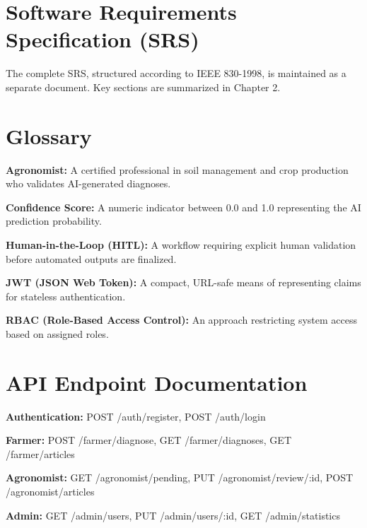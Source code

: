 \documentclass[12pt]{article}
\begin{document}
\newpage
\appendix
\section{Software Requirements Specification (SRS)}
The complete SRS, structured according to IEEE 830-1998, is maintained as a separate document. Key sections are summarized in Chapter 2.

\section{Glossary}
\textbf{Agronomist:} A certified professional in soil management and crop production who validates AI-generated diagnoses.

\textbf{Confidence Score:} A numeric indicator between 0.0 and 1.0 representing the AI prediction probability.

\textbf{Human-in-the-Loop (HITL):} A workflow requiring explicit human validation before automated outputs are finalized.

\textbf{JWT (JSON Web Token):} A compact, URL-safe means of representing claims for stateless authentication.

\textbf{RBAC (Role-Based Access Control):} An approach restricting system access based on assigned roles.

\section{API Endpoint Documentation}
\textbf{Authentication:} POST /auth/register, POST /auth/login

\textbf{Farmer:} POST /farmer/diagnose, GET /farmer/diagnoses, GET /farmer/articles

\textbf{Agronomist:} GET /agronomist/pending, PUT /agronomist/review/:id, POST /agronomist/articles

\textbf{Admin:} GET /admin/users, PUT /admin/users/:id, GET /admin/statistics
\end{document}
